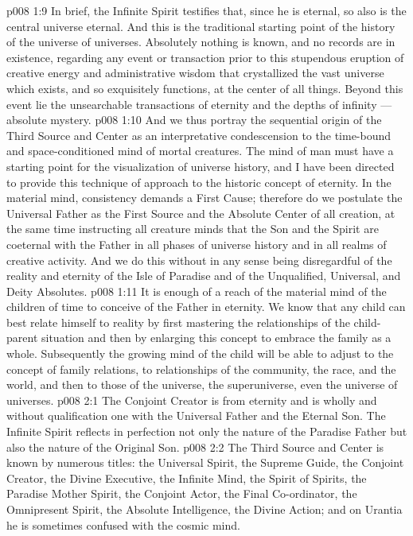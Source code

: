 \vs p008 1:9 In brief, the Infinite Spirit testifies that, since he is eternal, so also is the central universe eternal. And this is the traditional starting point of the history of the universe of universes. Absolutely nothing is known, and no records are in existence, regarding any event or transaction prior to this stupendous eruption of creative energy and administrative wisdom that crystallized the vast universe which exists, and so exquisitely functions, at the center of all things. Beyond this event lie the unsearchable transactions of eternity and the depths of infinity --- absolute mystery.
\vs p008 1:10 \pc And we thus portray the sequential origin of the Third Source and Center as an interpretative condescension to the time\hyp{}bound and space\hyp{}conditioned mind of mortal creatures. The mind of man must have a starting point for the visualization of universe history, and I have been directed to provide this technique of approach to the historic concept of eternity. In the material mind, consistency demands a First Cause; therefore do we postulate the Universal Father as the First Source and the Absolute Center of all creation, at the same time instructing all creature minds that the Son and the Spirit are coeternal with the Father in all phases of universe history and in all realms of creative activity. And we do this without in any sense being disregardful of the reality and eternity of the Isle of Paradise and of the Unqualified, Universal, and Deity Absolutes.
\vs p008 1:11 It is enough of a reach of the material mind of the children of time to conceive of the Father in eternity. We know that any child can best relate himself to reality by first mastering the relationships of the child\hyp{}parent situation and then by enlarging this concept to embrace the family as a whole. Subsequently the growing mind of the child will be able to adjust to the concept of family relations, to relationships of the community, the race, and the world, and then to those of the universe, the superuniverse, even the universe of universes.
\vs p008 2:1 The Conjoint Creator is from eternity and is wholly and without qualification one with the Universal Father and the Eternal Son. The Infinite Spirit reflects in perfection not only the nature of the Paradise Father but also the nature of the Original Son.
\vs p008 2:2 \pc The Third Source and Center is known by numerous titles: the Universal Spirit, the Supreme Guide, the Conjoint Creator, the Divine Executive, the Infinite Mind, the Spirit of Spirits, the Paradise Mother Spirit, the Conjoint Actor, the Final Co\hyp{}ordinator, the Omnipresent Spirit, the Absolute Intelligence, the Divine Action; and on Urantia he is sometimes confused with the cosmic mind.
